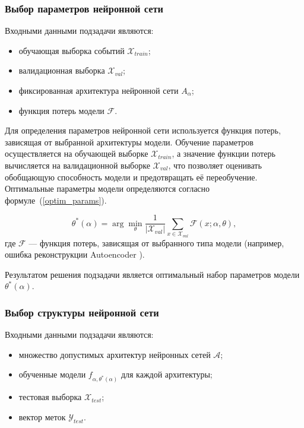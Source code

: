 \subsubsection{Выбор параметров нейронной сети}

Входными данными подзадачи являются:

\begin{itemize}
    \item обучающая выборка событий $\mathcal{X}_{train}$;
    \item валидационная выборка $\mathcal{X}_{val}$;
    \item фиксированная архитектура нейронной сети $A_\alpha$;
    \item функция потерь модели $\mathcal{F}$.
\end{itemize}

Для определения параметров нейронной сети используется функция потерь, зависящая от выбранной архитектуры модели. Обучение параметров осуществляется на обучающей выборке $\mathcal{X}_{train}$, а значение функции потерь вычисляется на валидационной выборке $\mathcal{X}_{val}$, что позволяет оценивать обобщающую способность модели и предотвращать её переобучение. Оптимальные параметры модели определяются согласно формуле~(\ref{optim_params}).


\begin{equation}\label{optim_params}
    \theta^*(\alpha) = \arg\min_{\theta} \frac{1}{|\mathcal{X}_{val}|} \sum_{x \in \mathcal{X}_{val}} \mathcal{F}(x; \alpha, \theta),
\end{equation}
где $\mathcal{F}$ — функция потерь, зависящая от выбранного типа модели (например, ошибка реконструкции Autoencoder \cite{AE}).

Результатом решения подзадачи является оптимальный набор параметров модели $\theta^*(\alpha)$.

\subsubsection{Выбор структуры нейронной сети}

Входными данными подзадачи являются:

\begin{itemize}
    \item множество допустимых архитектур нейронных сетей $\mathcal{A}$;
    \item обученные модели $f_{\alpha,\theta^*(\alpha)}$ для каждой архитектуры;
    \item тестовая выборка $\mathcal{X}_{test}$;
    \item вектор меток $\mathcal{Y}_{test}$.
\end{itemize}

